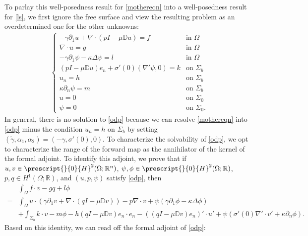 \documentclass[11pt,letterpaper,reqno]{amsart}
\numberwithin{equation}{section}
\begin{document}
To parlay this well-posedness result for \eqref{mothereqn} into a well-posedness result for \eqref{ls}, we first ignore the free surface and view the resulting problem as an overdetermined one for the other unknowns:
\begin{align} \label{odp}
    \begin{cases}
        -\gamma \partial_{1}u + \nabla \cdot (pI-\mu\mathbb{D}u) = f &\mbox{in \(\Omega\)} \\
        \nabla \cdot u = g &\mbox{in \(\Omega\)} \\
        -\gamma \partial_{1}\psi -\kappa\Delta\psi = l &\mbox{in \(\Omega\)} \\
        (pI-\mu\mathbb{D}u)e_{n} +\sigma'(0)(\nabla'\psi,0)= k &\mbox{on \(\Sigma_{b}\)} \\
        u_{n}=h &\mbox{on \(\Sigma_{b}\)} \\
        \kappa\partial_{n}\psi =m &\mbox{on \(\Sigma_{b}\)} \\
        u = 0 &\mbox{on \(\Sigma_{0}\)} \\
        \psi = 0 &\mbox{on \(\Sigma_{0}\)}.
    \end{cases}
\end{align}
In general, there is no solution to \eqref{odp} because we can resolve \eqref{mothereqn} into \eqref{odp} minus the condition \(u_{n}=h\) on \(\Sigma_{b}\) by setting \((\widetilde{\gamma},\alpha_{1},\alpha_{2})=(-\gamma,\sigma'(0),0)\). To characterize the solvability of \eqref{odp}, we opt to characterize the range of the forward map as the annihilator of the kernel of the formal adjoint.  To identify this adjoint, we prove that if  \(u,v \in \prescript{}{0}{H}^{2}(\Omega;\mathbb{R}^{n})\), \(\psi,\phi \in \prescript{}{0}{H}^{2}(\Omega;\mathbb{R})\), \(p,q \in H^{1}(\Omega;\mathbb{R})\), and \((u,p,\psi)\) satisfy \eqref{odp}, then 
\begin{align}
    &\int_{\Omega}f \cdot v-g q + l\phi \nonumber\\
    = &\int_{\Omega}u \cdot (\gamma \partial_{1}v+\nabla \cdot (qI-\mu\mathbb{D}v)) -p\nabla \cdot v + \psi(\gamma \partial_{1}\phi -\kappa\Delta\phi) \nonumber\\
    &+\int_{\Sigma_{b}} k \cdot v -m \phi -h(qI-\mu\mathbb{D}v)e_{n}\cdot e_{n}-((qI-\mu\mathbb{D}v)e_{n})'\cdot u'  + \psi(\sigma'(0)\nabla' \cdot v' + \kappa \partial_{n}\phi).
\end{align}
Based on this identity, we can read off the formal adjoint of \eqref{odp}:
\end{document}

